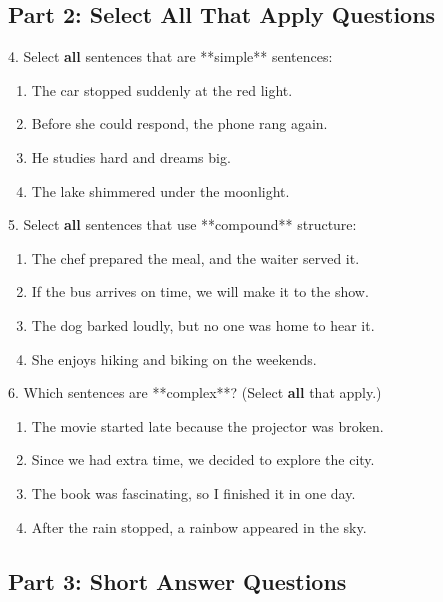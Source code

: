 \documentclass[12pt]{article}
\begin{document}
\vspace{1cm}

\subsection*{Part 2: Select All That Apply Questions}

4. Select \textbf{all} sentences that are **simple** sentences:  
\begin{enumerate}[label=\Alph*.]
    \item The car stopped suddenly at the red light.  
    \item Before she could respond, the phone rang again.  
    \item He studies hard and dreams big.  
    \item The lake shimmered under the moonlight.  
\end{enumerate}

\vspace{1cm}

5. Select \textbf{all} sentences that use **compound** structure:  
\begin{enumerate}[label=\Alph*.]
    \item The chef prepared the meal, and the waiter served it.  
    \item If the bus arrives on time, we will make it to the show.  
    \item The dog barked loudly, but no one was home to hear it.  
    \item She enjoys hiking and biking on the weekends.  
\end{enumerate}

\vspace{1cm}

6. Which sentences are **complex**? (Select \textbf{all} that apply.)  
\begin{enumerate}[label=\Alph*.]
    \item The movie started late because the projector was broken.  
    \item Since we had extra time, we decided to explore the city.  
    \item The book was fascinating, so I finished it in one day.  
    \item After the rain stopped, a rainbow appeared in the sky.  
\end{enumerate}

\vspace{1cm}
\newpage
\subsection*{Part 3: Short Answer Questions}
\end{document}
